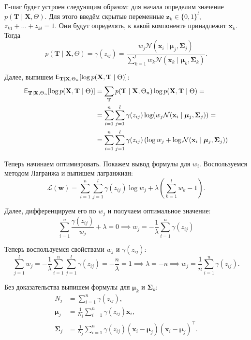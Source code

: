 Е-шаг будет устроен следующим образом: для начала определим значение 
\(p(\mathbf{T} \mid \mathbf{X}, \Theta)\). Для этого введём скрытые переменные 
\(\mathbf{z}_{k} \in \{0, 1\}^{l}\), \(z_{k1} + \ldots + z_{kl} = 1\). Они 
будут определять, к какой компоненте принадлежит \(\mathbf{x}_{k}\). Тогда
\[
	p(\mathbf{T} \mid \mathbf{X}, \Theta) = \gamma(z_{ij}) = 
	\frac{w_{j}\mathcal{N}(\mathbf{x}_{i} \mid \bm{\mu}_{j}, 
	\bm{\Sigma}_{j})}{\sum_{k = 1}^{l} w_{k}\mathcal{N}(\mathbf{x}_{k} \mid 
	\bm{\mu}_{k}, \bm{\Sigma}_{k})}.
\]

Далее, выпишем \(\E_{\mathbf{T} \mid \mathbf{X}, \Theta_{n}}[\log p(\mathbf{X}, 
\mathbf{T} \mid \Theta)]\):
\begin{align*}
	\E_{\mathbf{T} \mid \mathbf{X}, \Theta_{n}}[\log p(\mathbf{X}, 
	\mathbf{T} \mid \Theta)] &= \sum_{\mathbf{T}} p(\mathbf{T} \mid \mathbf{X}, 
	\Theta_{n})\log p(\mathbf{X}, \mathbf{T} \mid \Theta) =  \\
	&= \sum_{i = 1}^{n}\sum_{j = 1}^{l} \gamma(z_{ij}) 
	\log(w_{j}\mathcal{N}(\mathbf{x}_{i} \mid \bm{\mu}_{j}, \bm{\Sigma}_{j})) = 
	\\
	&= \sum_{i = 1}^{n}\sum_{j = 1}^{l} \gamma(z_{ij}) 
	\left(\log w_{j} + \log\mathcal{N}(\mathbf{x}_{i} \mid \bm{\mu}_{j}, 
	\bm{\Sigma}_{j})\right)
\end{align*}

Теперь начинаем оптимизровать. Покажем вывод формулы для \(w_{i}\). 
Воспользуемся методом Лагранжа и выпишем лагранжиан:
\[
	\mathcal{L}(\mathbf{w}) = \sum_{i = 1}^{n}\sum_{j = 1}^{l} \gamma(z_{ij}) 
	\log w_{j} + \lambda\left(\sum_{k = 1}^{l} w_{k} - 1\right).
\]

Далее, дифференцируем его по \(w_{j}\) и получаем оптимальное значение:
\[
	\sum_{i = 1}^{n} \frac{\gamma(z_{ij})}{w_{j}} + \lambda = 0 \implies w_{j} 
	= -\frac{1}{\lambda}\sum_{i = 1}^{n} \gamma(z_{ij})
\]

Теперь воспользуемся свойствами \(w_{j}\) и \(\gamma(z_{ij})\):
\[
	\sum_{j = 1}^{l} w_{j} = -\frac{1}{\lambda} \sum_{i = 1}^{n} \sum_{j = 
	1}^{l} \gamma(z_{ij}) = -\frac{n}{\lambda} = 1 \implies \lambda = -n 
	\implies w_{j} = \frac{1}{n}\sum_{i = 1}^{n} \gamma(z_{ij}).
\]

Без доказательства выпишем формулы для \(\bm{\mu}_{k}\) и \(\bm{\Sigma}_{k}\):
\begin{align*}
	N_{j} &= \sum_{i = 1}^{n} \gamma(z_{ij}), \\
	\bm{\mu}_{j} &= \frac{1}{N_{j}}\sum_{i = 1}^{n}\gamma(z_{ij})\bm{x}_{i}, \\
	\bm{\Sigma}_{j} &= \frac{1}{N_{j}}\sum_{i = 1}^{n}\gamma(z_{ij})(\bm{x}_{i} 
	- \bm{\mu}_{j})(\bm{x}_{i} - \bm{\mu}_{j})^{\intercal}.
\end{align*}

